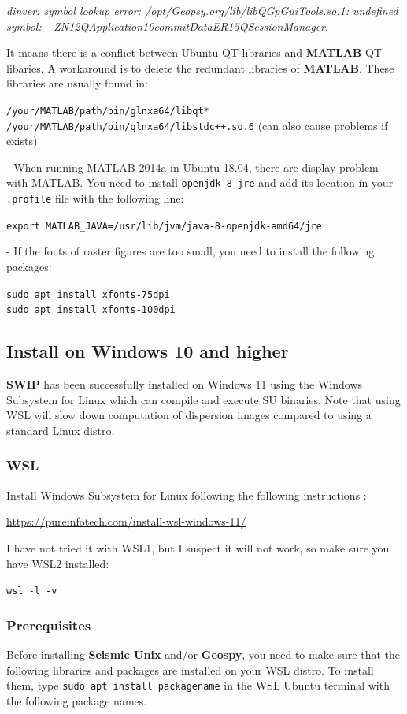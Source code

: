 \documentclass[twoside,a4paper]{article}
\def\SWIP{\textbf{SWIP}}
\def\SeismicUnix{\textbf{Seismic Unix}}
\def\Geopsy{\textbf{Geospy}}
\def\MATLAB{\textbf{MATLAB}}
\begin{document}
\textit{dinver: symbol lookup error: /opt/Geopsy.org/lib/libQGpGuiTools.so.1: undefined symbol: \_ZN12QApplication10commitDataER15QSessionManager}.

It means there is a conflict between Ubuntu QT libraries and {\MATLAB} QT libaries. A workaround is to delete the redundant libraries of {\MATLAB}. These libraries are usually found in:

\verb|/your/MATLAB/path/bin/glnxa64/libqt*|\\
\verb|/your/MATLAB/path/bin/glnxa64/libstdc++.so.6| (can also cause problems if exists)

- When running MATLAB 2014a in Ubuntu 18.04, there are display problem with MATLAB. You need to install \verb|openjdk-8-jre| and add its location in your \verb|.profile| file with the following line:

\verb|export MATLAB_JAVA=/usr/lib/jvm/java-8-openjdk-amd64/jre|

- If the fonts of raster figures are too small, you need to install the following packages:

\verb|sudo apt install xfonts-75dpi|\\
\verb|sudo apt install xfonts-100dpi|

\clearpage
\subsection{Install on Windows 10 and higher}
{\SWIP} has been successfully installed on Windows 11 using the Windows Subsystem for Linux which can compile and execute SU binaries. Note that using WSL will slow down computation of dispersion images compared to using a standard Linux distro.

\subsubsection{WSL}
\label{sec:wsl}
Install Windows Subsystem for Linux following the following instructions :

\url{https://pureinfotech.com/install-wsl-windows-11/}

I have not tried it with WSL1, but I suspect it will not work, so make sure you have WSL2 installed:

\verb|wsl -l -v|

\subsubsection{Prerequisites}
Before installing {\SeismicUnix} and/or {\Geopsy}, you need to make sure that the following libraries and packages are installed on your WSL distro. To install them, type \verb|sudo apt install packagename| in the WSL Ubuntu terminal with the following package names.
\end{document}
